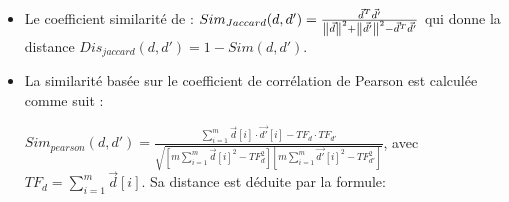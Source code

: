 \begin{itemize}
	\item Le coefficient similarité de \cite{jaccard1901similarite-jaccard}: {\footnotesize$Sim_{Jaccard}(d,d') = \frac{\vec{d}^T\vec{d'}}{\left\lVert\vec{d}\right\rVert^2+\left\lVert\vec{d'}\right\rVert^2 - \vec{d}^T\vec{d'}}$} \citep{huang2008similarityTextClustering} qui donne la distance {\footnotesize$Dis_{jaccard}(d,d') = 1-Sim(d,d')$}.
	\item La similarité basée sur le coefficient de corrélation de Pearson est calculée comme suit \citep{huang2008similarityTextClustering}:
	
	{\footnotesize $Sim_{pearson}(d,d') = \frac{ \sum\limits^m_{i=1} \vec{d}[i] \cdot \vec{d'}[i] - TF_d\cdot TF_{d'}}{\sqrt{[m \sum\limits^m_{i=1} \vec{d}[i]^2 - TF^2_d][m \sum\limits^m_{i=1} \vec{d'}[i]^2 - TF^2_{d'}]}}$}, 
avec $TF_d = \sum\limits^m_{i=1} \vec{d}[i]$. Sa distance est déduite par la formule:


\end{itemize}
